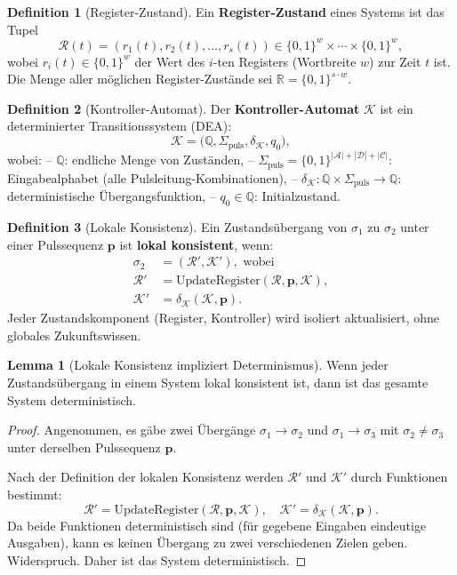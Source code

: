 \documentclass[a4paper,12pt]{article}
\theoremstyle{definition}
\newtheorem{definition}{Definition}
\newtheorem{lemma}{Lemma}
\begin{document}
\begin{definition}[Register-Zustand]
	Ein \textbf{Register-Zustand} eines Systems ist das Tupel
	\[
	\mathcal{R}(t) = (r_1(t), r_2(t), \ldots, r_s(t)) \in \{0,1\}^{w} \times \cdots \times \{0,1\}^{w},
	\]
	wobei $r_i(t) \in \{0,1\}^{w}$ der Wert des $i$-ten Registers (Wortbreite $w$) zur Zeit $t$ ist. Die Menge aller möglichen Register-Zustände sei $\mathbb{R} = \{0,1\}^{s \cdot w}$.
\end{definition}

\begin{definition}[Kontroller-Automat]
	Der \textbf{Kontroller-Automat} $\mathcal{K}$ ist ein determinierter Transitionssystem (DEA):
	\[
	\mathcal{K} = \bigl(\mathbb{Q}, \Sigma_{\text{puls}}, \delta_{\mathcal{K}}, q_0\bigr),
	\]
	wobei:
	-- $\mathbb{Q}$: endliche Menge von Zuständen,
	-- $\Sigma_{\text{puls}} = \{0, 1\}^{|\mathcal{A}| + |\mathcal{D}| + |\mathcal{C}|}$: Eingabealphabet (alle Pulsleitung-Kombinationen),
	-- $\delta_{\mathcal{K}}: \mathbb{Q} \times \Sigma_{\text{puls}} \to \mathbb{Q}$: deterministische Übergangsfunktion,
	-- $q_0 \in \mathbb{Q}$: Initialzustand.
\end{definition}

\begin{definition}[Lokale Konsistenz]
	\label{def:lokale_konsistenz}
	Ein Zustandsübergang von $\sigma_1$ zu $\sigma_2$ unter einer Pulssequenz $\mathbf{p}$ ist \textbf{lokal konsistent}, wenn:
	\[
	\begin{aligned}
	\sigma_2 &= (\mathcal{R}', \mathcal{K}'), \text{ wobei} \\
	\mathcal{R}' &= \text{UpdateRegister}(\mathcal{R}, \mathbf{p}, \mathcal{K}), \\
	\mathcal{K}' &= \delta_{\mathcal{K}}(\mathcal{K}, \mathbf{p}).
	\end{aligned}
	\]
	Jeder Zustandskomponent (Register, Kontroller) wird isoliert aktualisiert, ohne globales Zukunftswissen.
\end{definition}

\begin{lemma}[Lokale Konsistenz impliziert Determinismus]
	\label{lem:lokale_konsistenz}
	Wenn jeder Zustandsübergang in einem System lokal konsistent ist, dann ist das gesamte System deterministisch.
\end{lemma}

\begin{proof}
	Angenommen, es gäbe zwei Übergänge $\sigma_1 \to \sigma_2$ und $\sigma_1 \to \sigma_3$ mit $\sigma_2 \neq \sigma_3$ unter derselben Pulssequenz $\mathbf{p}$.
	
	Nach der Definition der lokalen Konsistenz werden $\mathcal{R}'$ und $\mathcal{K}'$ durch Funktionen bestimmt:
	\[
	\mathcal{R}' = \text{UpdateRegister}(\mathcal{R}, \mathbf{p}, \mathcal{K}), \quad \mathcal{K}' = \delta_{\mathcal{K}}(\mathcal{K}, \mathbf{p}).
	\]
	Da beide Funktionen deterministisch sind (für gegebene Eingaben eindeutige Ausgaben), kann es keinen Übergang zu zwei verschiedenen Zielen geben. Widerspruch. Daher ist das System deterministisch.
\end{proof}
\end{document}

